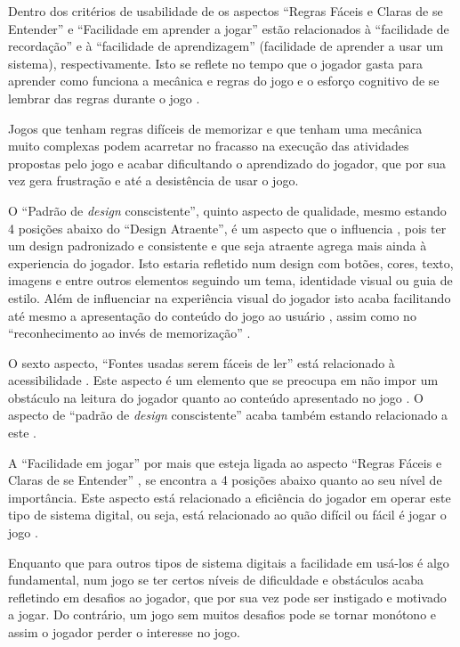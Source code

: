 Dentro dos critérios de usabilidade de  os aspectos ``Regras Fáceis e Claras de se Entender'' e ``Facilidade em aprender a jogar'' estão relacionados à ``facilidade de recordação'' e à ``facilidade de aprendizagem'' (facilidade de aprender a usar um sistema), respectivamente. Isto se reflete no tempo que o jogador gasta para aprender como funciona a mecânica e regras do jogo e o esforço cognitivo de se lembrar das regras durante o jogo \cite{silva_sales_mendes2021}. 

Jogos que tenham regras difíceis de memorizar e que tenham uma mecânica muito complexas podem acarretar no fracasso na execução das atividades propostas pelo jogo e acabar dificultando o aprendizado do jogador, que por sua vez gera frustração e até a desistência de usar o jogo. 

O ``Padrão de \textit{design} conscistente'', quinto aspecto de qualidade, mesmo estando 4 posições abaixo do ``Design Atraente'', é um aspecto que o influencia \cite{Petri_Wangenheim_2019}, pois ter um design padronizado e consistente e que seja atraente agrega mais ainda à experiencia do jogador. Isto estaria refletido num design com botões, cores, texto, imagens e entre outros elementos seguindo um tema, identidade visual ou guia de estilo. Além de influenciar na experiência visual do jogador isto acaba facilitando até mesmo a apresentação do conteúdo do jogo ao usuário \cite{silva_sales_mendes2021}, assim como no ``reconhecimento ao invés de memorização'' \cite{nielsen1994}.

O sexto aspecto, ``Fontes usadas serem fáceis de ler'' está relacionado à acessibilidade \cite{Petri_Wangenheim_2019}. Este aspecto é um elemento que se preocupa em não impor um obstáculo na leitura do jogador quanto ao conteúdo apresentado no jogo \cite{silva_sales_mendes2021}. O aspecto de ``padrão de \textit{design} conscistente'' acaba também estando relacionado a este \cite{Petri_Wangenheim_2019}.

A ``Facilidade em jogar'' por mais que esteja ligada ao aspecto ``Regras Fáceis e Claras de se Entender'' \cite{Petri_Wangenheim_2019}, se encontra a 4 posições abaixo quanto ao seu nível de importância. Este aspecto está relacionado a eficiência do jogador em operar este tipo de sistema digital, ou seja, está relacionado ao quão difícil ou fácil é jogar o jogo \cite{silva_sales_mendes2021}. 

Enquanto que para outros tipos de sistema digitais a facilidade em usá-los é algo fundamental, num jogo se ter certos níveis de dificuldade e obstáculos acaba refletindo em desafios ao jogador, que por sua vez pode ser instigado e motivado a jogar. Do contrário, um jogo sem muitos desafios pode se tornar monótono e assim o jogador perder o interesse no jogo.  


